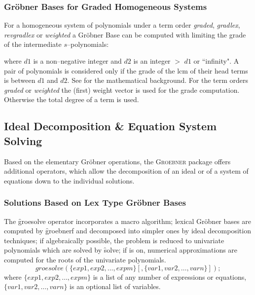 \subsubsection{Gr\"obner Bases for Graded Homogeneous Systems}

For a homogeneous system of polynomials under a term order
\textit{graded}, \textit{gradlex}, \textit{revgradlex} or \textit{weighted}
a Gr\"obner Base can be computed with limiting the grade
of the intermediate $s$--polynomials:
\begin{description}
\item[\f{dd\_groebner}($d1,d2,\{p_1,p_2,\ldots\}$);]
  \hypertarget{operator:DD_GROEBNER}{}
\end{description}
where $d1$ is a non--negative integer and $d2$ is an integer
$>$ $d1$ or ``infinity". A pair of polynomials is considered
only if the grade of the lcm of their head terms is between
$d1$ and $d2$. See \cite{Becker:93} for the mathematical background.
For the term orders \textit{graded} or \textit{weighted} the (first) weight
vector is used for the grade computation. Otherwise the total
degree of a term is used.

\subsection{Ideal Decomposition \& Equation System Solving}
Based on the elementary Gr\"obner operations, the \textsc{Groebner} package offers
additional operators, which allow the decomposition of an ideal or of a
system of equations down to the individual solutions.

\subsubsection{Solutions Based on Lex Type Gr\"obner Bases}

 
\hypertarget{operator:GROESOLVE}{}
The \f{groesolve} operator incorporates a macro algorithm;
lexical Gr\"obner bases are computed by \f{groebnerf} and decomposed
into simpler ones by ideal decomposition techniques; if algebraically
possible, the problem is reduced to univariate polynomials which are
solved by \f{solve}; if  is on, numerical approximations are
computed for the roots of the univariate polynomials.
\[
 groesolve(\{exp1, exp2, \ldots , expm\}[,\{var1, var2, \ldots ,
varn\}]); \]
where $\{exp1, exp2,\ldots , expm\}$ is a list of any number of
expressions or equations, $\{var1, var2, \ldots , varn\}$ is an
optional list of variables.

